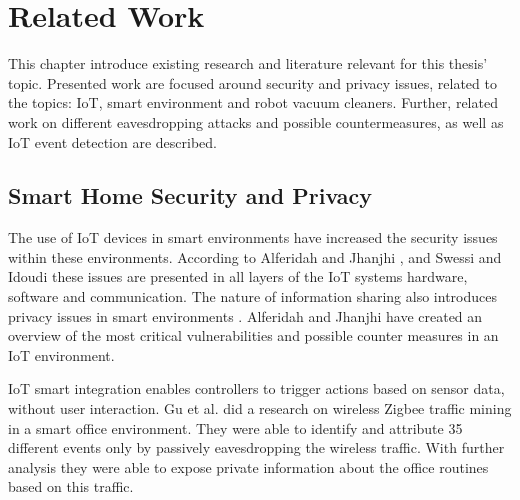 \chapter{Related Work}
This chapter introduce existing research and literature relevant for this thesis' topic. Presented work are focused around security and privacy issues, related to the topics: \gls{IoT}, smart environment and robot vacuum cleaners. Further, related work on different eavesdropping attacks and possible countermeasures, as well as IoT event detection are described.

\section{Smart Home Security and Privacy}
The use of \gls{IoT} devices in smart environments have increased the security issues within these environments. According to Alferidah and Jhanjhi \cite{Iotissues}, and Swessi and  Idoudi \cite{iotissues1} these issues are presented in all layers of the \gls{IoT} systems hardware, software and communication. The nature of information sharing also introduces privacy issues in smart environments \cite{Iotissues}. Alferidah and Jhanjhi \cite{Iotissues} have created an overview of the most critical vulnerabilities and possible counter measures in an \gls{IoT} environment. 

\gls{IoT} smart integration enables controllers to trigger actions based on sensor data, without user interaction. Gu et al. \cite{eavsIoT} did a research on wireless Zigbee traffic mining in a smart office environment. They were able to identify and attribute 35 different events only by passively eavesdropping the wireless traffic. With further analysis they were able to expose private information about the office routines based on this traffic.  

